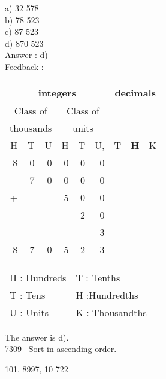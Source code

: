 \documentclass[letterpaper, 12pt]{article}
\begin{document}
a) 32 578\\
b) 78 523\\
c) 87 523\\
d) 870 523\\

Answer : d)\\

Feedback :\\
\begin{center}
\begin{tabular}{|rrr|rrr|rrr|}
\hline
\multicolumn{6}{|c|}{integers} &\multicolumn{3}{|c|}{decimals} \\
\hline
\multicolumn{3}{|c|}{Class of} &\multicolumn{3}{|c|}{Class of} &  \multicolumn{3}{c|}{} \\
\multicolumn{3}{|c|}{thousands} &\multicolumn{3}{|c|}{units} &  \multicolumn{3}{c|}{} \\
\hline
H & T & U &H & T & U, & T\up{th} & \textbf{H\up{th}} & K\up{th} \\
\hline
\hline
8 & 0 & 0 & 0 & 0 & 0 &  & &\\
 & 7 & 0 & 0 & 0 & 0 &  & &\\
+ &  &  & 5 & 0 & 0 &  & &\\
 &  &  &  & 2 & 0 &  & &\\
 &  &  &  &  & 3 &  & &\\
\hline
\hline
 8 & 7 & 0 & 5 & 2 & 3 &  & &
\\
\hline
\end{tabular}
\end{center}

\scriptsize
\begin{center}
\begin{tabular}{ll}
H : Hundreds & T\up{th} : Tenths\\
T : Tens & H\up{th} :Hundredths\\
U : Units & K\up{e} : Thousandths\\
\end{tabular}
\end{center}

\normalsize
The answer is d).\\




7309-- Sort in ascending order.\\ 
\begin{center}
101, 8997, 10 722\\
\end{center}
\end{document}
